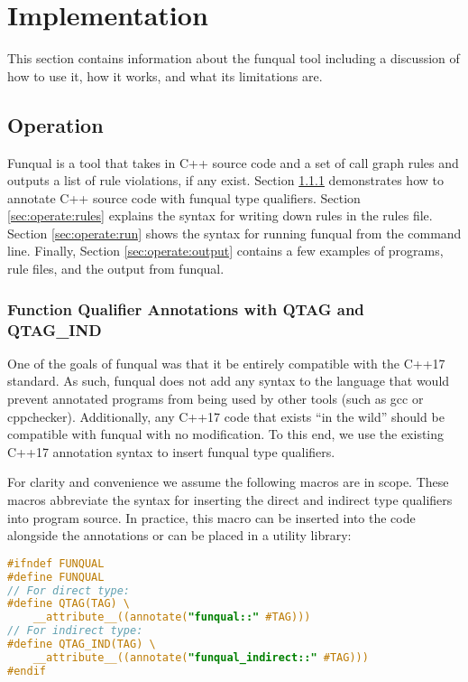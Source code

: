 \chapter{Implementation}\label{sec:implementation}

This section contains information about the funqual tool including a discussion of how to use it, how it works, and what its limitations are. 

\section{Operation}\label{sec:operation}

Funqual is a tool that takes in C++ source code and a set of call graph rules and outputs a list of rule violations, if any exist.  Section \ref{sec:operate:annote} demonstrates how to annotate C++ source code with funqual type qualifiers.  Section \ref{sec:operate:rules} explains the syntax for writing down rules in the rules file.  Section \ref{sec:operate:run} shows the syntax for running funqual from the command line.  Finally, Section \ref{sec:operate:output} contains a few examples of programs, rule files, and the output from funqual.  

\subsection{Function Qualifier Annotations with QTAG and QTAG\_IND}\label{sec:operate:annote}

One of the goals of funqual was that it be entirely compatible with the C++17 standard.  As such, funqual does not add any syntax to the language that would prevent annotated programs from being used by other tools (such as gcc or cppchecker).  Additionally, any C++17 code that exists ``in the wild'' should be compatible with funqual with no modification.  To this end, we use the existing C++17 annotation syntax to insert funqual type qualifiers.  

For clarity and convenience we assume the following macros are in scope.  These macros abbreviate the syntax for inserting the direct and indirect type qualifiers into program source.  In practice, this macro can be inserted into the code alongside the annotations or can be placed in a utility library:

\noindent\begin{minipage}[t]{\linewidth}
\begin{lstlisting}[language=C,caption={}]
#ifndef FUNQUAL
#define FUNQUAL
// For direct type:
#define QTAG(TAG) \
    __attribute__((annotate("funqual::" #TAG)))
// For indirect type:
#define QTAG_IND(TAG) \
    __attribute__((annotate("funqual_indirect::" #TAG)))
#endif
\end{lstlisting}
\end{minipage}

